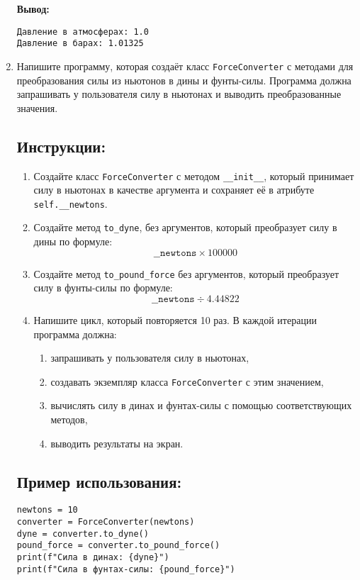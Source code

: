 \begin{enumerate}
\textbf{Вывод:}
\begin{verbatim}
Давление в атмосферах: 1.0
Давление в барах: 1.01325
\end{verbatim}

\item 

Напишите программу, которая создаёт класс \texttt{ForceConverter} с методами для преобразования силы
из ньютонов в дины и фунты-силы. Программа должна запрашивать у пользователя силу в ньютонах
и выводить преобразованные значения.

\subsection*{Инструкции:}
\begin{enumerate}
\item Создайте класс \texttt{ForceConverter} с методом
\texttt{\_\_init\_\_}, который принимает силу в ньютонах в
качестве аргумента и сохраняет её в атрибуте \texttt{self.\_\_newtons}.

\item Создайте метод \texttt{to\_dyne},
без аргументов, который преобразует силу в дины по формуле:
\[
\texttt{\_\_newtons} \times 100000
\]

\item Создайте метод \texttt{to\_pound\_force} без аргументов,
который преобразует силу в фунты-силы по формуле:
\[
\texttt{\_\_newtons} \div 4.44822
\]

\item Напишите цикл, который повторяется 10 раз. В каждой итерации программа должна:
\begin{enumerate}
\item запрашивать у пользователя силу в ньютонах,
\item создавать экземпляр класса \texttt{ForceConverter} с этим значением,
\item вычислять силу в динах и фунтах-силы с помощью соответствующих методов,
\item выводить результаты на экран.
\end{enumerate}
\end{enumerate}

\subsection*{Пример использования:}
\begin{verbatim}
newtons = 10
converter = ForceConverter(newtons)
dyne = converter.to_dyne()
pound_force = converter.to_pound_force()
print(f"Сила в динах: {dyne}")
print(f"Сила в фунтах-силы: {pound_force}")
\end{verbatim}


\end{enumerate}
